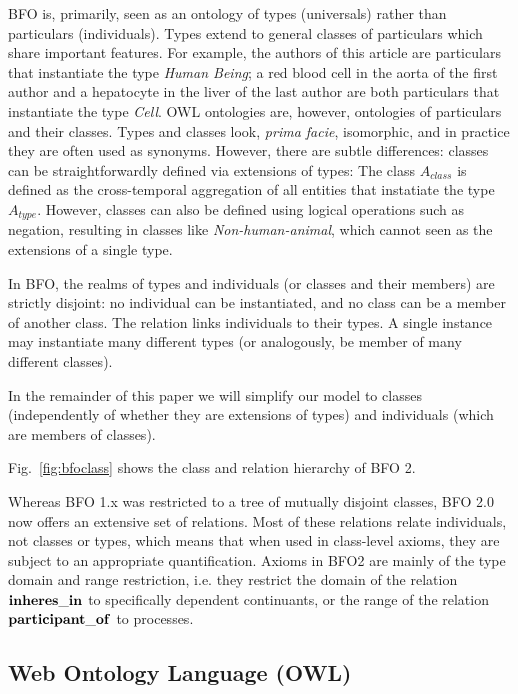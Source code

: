 BFO is, primarily, seen as an ontology of types (universals) rather than particulars (individuals). Types extend to general classes of particulars which share important features. For example, the authors of this article are particulars that instantiate the type \emph{Human Being}; a red blood cell in the aorta of the first author and a hepatocyte in the liver of the last author are both particulars that instantiate the type \emph{Cell}. 
OWL ontologies are, however, ontologies of particulars and their classes. Types and classes look, \emph{prima facie}, isomorphic, and in practice they are often used as synonyms. However, there are subtle differences: 
classes can be straightforwardly defined via extensions of types: The class $A_{class}$ is defined as the cross-temporal aggregation of all entities that instatiate the 
type $A_{type}$. However, classes can also be defined using logical operations such as negation, resulting in classes like \emph{Non-human-animal}, which cannot seen as the extensions of a single type.  

In BFO, the realms of types and individuals (or classes and their members) 
are strictly disjoint: no individual can be instantiated, and no class can be a member of another class. The relation  links individuals to their types. A single instance may instantiate many different types (or analogously, be member of many different classes). 

In the remainder of this paper we will simplify our model to classes (independently of whether they are extensions of types) and individuals (which are members of classes).  

Fig.\ \ref{fig:bfoclass} shows the class and relation hierarchy of BFO 2.  


 
Whereas BFO 1.x was restricted to a tree of mutually disjoint classes, BFO 2.0 now offers an extensive set of relations. 
Most of these relations relate individuals, not classes or types, which means that when used in class-level axioms, they are 
subject to an appropriate quantification. Axioms in BFO2 are mainly of the type domain and range restriction, i.e. they restrict the domain of the relation $\mathrm{\mathbf{inheres\_in}}$ to specifically 
dependent continuants, or the range of the relation $\mathrm{\mathbf{participant\_of}}$ to processes.  



\subsection*{Web Ontology Language (OWL)}

